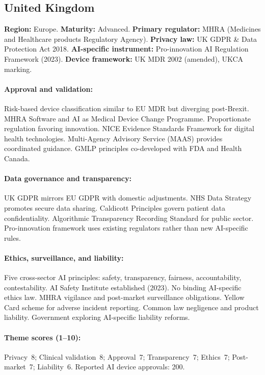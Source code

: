 {\subsection{United Kingdom}
\textbf{Region:} Europe.
\textbf{Maturity:} Advanced.
\textbf{Primary regulator:} MHRA (Medicines and Healthcare products Regulatory Agency).
\textbf{Privacy law:} UK GDPR \& Data Protection Act 2018.
\textbf{AI-specific instrument:} Pro-innovation AI Regulation Framework (2023).
\textbf{Device framework:} UK MDR 2002 (amended), UKCA marking.

\paragraph{Approval and validation:}
Risk-based device classification similar to EU MDR but diverging post-Brexit. MHRA Software and AI as Medical Device Change Programme. Proportionate regulation favoring innovation.
NICE Evidence Standards Framework for digital health technologies. Multi-Agency Advisory Service (MAAS) provides coordinated guidance. GMLP principles co-developed with FDA and Health Canada.

\paragraph{Data governance and transparency:}
UK GDPR mirrors EU GDPR with domestic adjustments. NHS Data Strategy promotes secure data sharing. Caldicott Principles govern patient data confidentiality.
Algorithmic Transparency Recording Standard for public sector. Pro-innovation framework uses existing regulators rather than new AI-specific rules.

\paragraph{Ethics, surveillance, and liability:}
Five cross-sector AI principles: safety, transparency, fairness, accountability, contestability. AI Safety Institute established (2023). No binding AI-specific ethics law.
MHRA vigilance and post-market surveillance obligations. Yellow Card scheme for adverse incident reporting.
Common law negligence and product liability. Government exploring AI-specific liability reforms.

\paragraph{Theme scores (1--10):}
Privacy~8;
Clinical validation~8;
Approval~7;
Transparency~7;
Ethics~7;
Post-market~7;
Liability~6.
Reported AI device approvals: 200.

}
